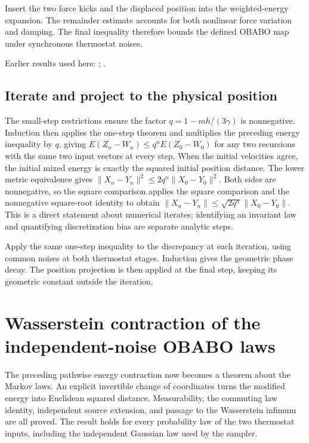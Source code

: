 \documentclass[11pt,a4paper]{report}
\begin{document}
Insert the two force kicks and the displaced position into the weighted-energy expansion. The remainder estimate accounts for both nonlinear force variation and damping. The final inequality therefore bounds the defined OBABO map under synchronous thermostat noises.



Earlier results used here: \cite[Section~3.10.2]{LangevinLean2026ULASC}; \cite[Section~3.10.3]{LangevinLean2026ULASC}.
\subsection{\texorpdfstring{Iterate and project to the physical position}{Iterate and project to the physical position}}
\label{report-step-KineticLangevin-OBABOContraction-lean-3}


The small-step restrictions ensure the factor \(q=1-mh/(3\gamma)\) is nonnegative. Induction then applies the one-step theorem and multiplies the preceding energy inequality by \(q\), giving \(E(Z_n-W_n)\le q^nE(Z_0-W_0)\) for any two recursions with the same two input vectors at every step. When the initial velocities agree, the initial mixed energy is exactly the squared initial position distance. The lower metric equivalence gives \(\|X_n-Y_n\|^2\le2q^n\|X_0-Y_0\|^2\). Both sides are nonnegative, so the square comparison applies the square comparison and the nonnegative square-root identity to obtain \(\|X_n-Y_n\|\le\sqrt{2q^n}\|X_0-Y_0\|\). This is a direct statement about numerical iterates; identifying an invariant law and quantifying discretization bias are separate analytic steps.



Apply the same one-step inequality to the discrepancy at each iteration, using common noises at both thermostat stages. Induction gives the geometric phase decay. The position projection is then applied at the final step, keeping its geometric constant outside the iteration.

\section{\texorpdfstring{Wasserstein contraction of the independent-noise OBABO laws}{Wasserstein contraction of the independent-noise OBABO laws}}
\label{proof-module-KineticLangevin-OBABOLaw-lean}


The preceding pathwise energy contraction now becomes a theorem about the Markov laws. An explicit invertible change of coordinates turns the modified energy into Euclidean squared distance. Measurability, the commuting law identity, independent source extension, and passage to the Wasserstein infimum are all proved. The result holds for every probability law of the two thermostat inputs, including the independent Gaussian law used by the sampler.
\end{document}
